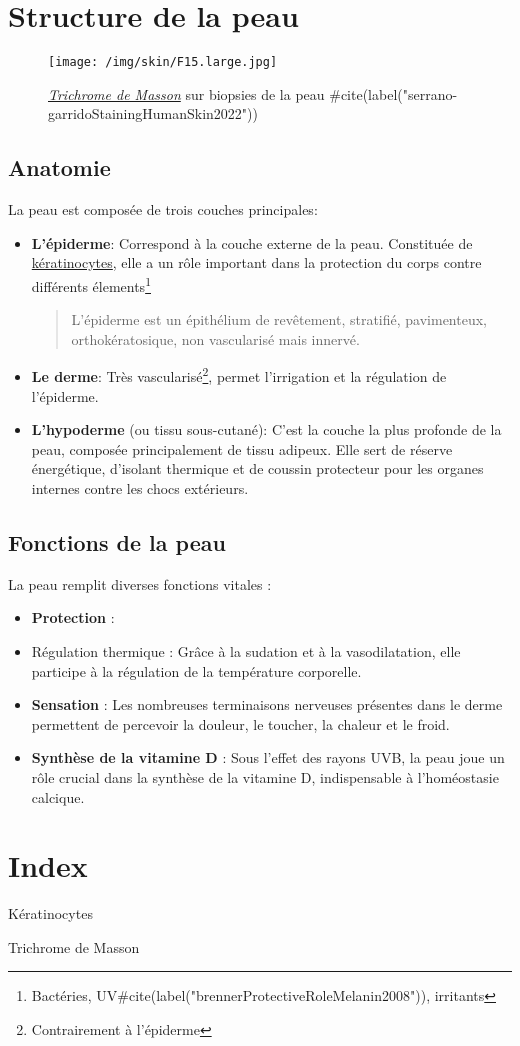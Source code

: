 \section{Structure de la peau}
\label{sec:orgcf08ddd}
\begin{figure}[htbp]
\centering
\texttt{[image: /img/skin/F15.large.jpg]}
\caption{\emph{\protect\hyperlink{gls-1}{\label{gls-1-use-1}Trichrome de Masson}} sur biopsies de la peau #cite(label("serrano-garridoStainingHumanSkin2022"))}
\end{figure}
\subsection{Anatomie}
\label{sec:org12c7c34}
La peau est composée de trois couches principales: 

\begin{itemize}
\item \textbf{L'épiderme}: Correspond à la couche externe de la peau. Constituée de
\protect\hyperlink{gls-2}{\label{gls-2-use-1}kératinocytes}, elle a un rôle important dans la protection du corps contre
différents élements\footnote{Bactéries, UV#cite(label("brennerProtectiveRoleMelanin2008")), irritants}
\begin{quote}
L’épiderme est un épithélium de revêtement, stratifié, pavimenteux, orthokératosique, non vascularisé mais innervé.
\end{quote}

\item \textbf{Le derme}: Très vascularisé\footnote{Contrairement à l'épiderme}, permet l'irrigation et la régulation de l'épiderme.

\item \textbf{L'hypoderme} (ou tissu sous-cutané): C'est la couche la plus profonde de la peau, composée principalement de tissu adipeux. Elle sert de réserve énergétique, d'isolant thermique et de coussin protecteur pour les organes internes contre les chocs extérieurs.
\end{itemize}
\subsection{Fonctions de la peau}
\label{sec:orgff89a5f}
La peau remplit diverses fonctions vitales :

\begin{itemize}
\item \textbf{Protection} :
\item Régulation thermique : Grâce à la sudation et à la vasodilatation, elle participe à la régulation de la température corporelle.
\item \textbf{Sensation} : Les nombreuses terminaisons nerveuses présentes dans le derme permettent de percevoir la douleur, le toucher, la chaleur et le froid.
\item \textbf{Synthèse de la vitamine D} : Sous l'effet des rayons UVB, la peau joue un rôle
crucial dans la synthèse de la vitamine D, indispensable à l'homéostasie
calcique.
\end{itemize}
\section{Index}
\label{sec:org4021963}
\hypertarget{gls-1}{Kératinocytes}\hspace*{.5em}\pageref{gls-2-use-1}

\hypertarget{gls-2}{Trichrome de Masson}\hspace*{.5em}\pageref{gls-1-use-1}
